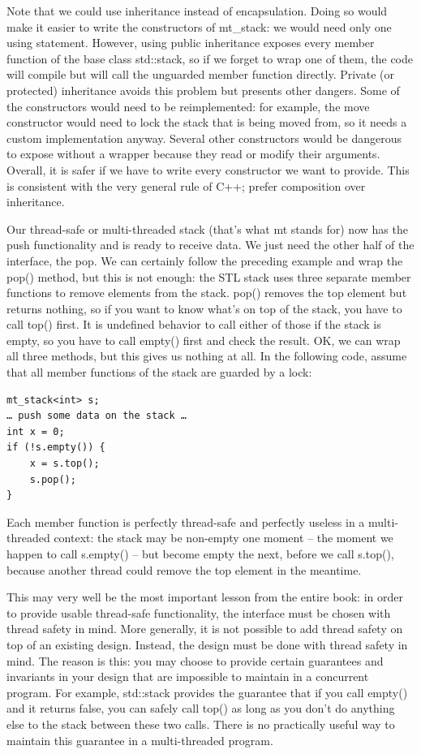 Note that we could use inheritance instead of encapsulation. Doing so would make it easier to write the constructors of mt\_stack: we would need only one using statement. However, using public inheritance exposes every member function of the base class std::stack, so if we forget to wrap one of them, the code will compile but will call the unguarded member function directly. Private (or protected) inheritance avoids this problem but presents other dangers. Some of the constructors would need to be reimplemented: for example, the move constructor would need to lock the stack that is being moved from, so it needs a custom implementation anyway. Several other constructors would be dangerous to expose without a wrapper because they read or modify their arguments. Overall, it is safer if we have to write every constructor we want to provide. This is consistent with the very general rule of C++; prefer composition over inheritance.

Our thread-safe or multi-threaded stack (that's what mt stands for) now has the push functionality and is ready to receive data. We just need the other half of the interface, the pop. We can certainly follow the preceding example and wrap the pop() method, but this is not enough: the STL stack uses three separate member functions to remove elements from the stack. pop() removes the top element but returns nothing, so if you want to know what's on top of the stack, you have to call top() first. It is undefined behavior to call either of those if the stack is empty, so you have to call empty() first and check the result. OK, we can wrap all three methods, but this gives us nothing at all. In the following code, assume that all member functions of the stack are guarded by a lock:

\begin{lstlisting}[style=styleCXX]
mt_stack<int> s;
… push some data on the stack …
int x = 0;
if (!s.empty()) {
	x = s.top();
	s.pop();
}
\end{lstlisting}

Each member function is perfectly thread-safe and perfectly useless in a multi-threaded context: the stack may be non-empty one moment – the moment we happen to call s.empty() – but become empty the next, before we call s.top(), because another thread could remove the top element in the meantime.

This may very well be the most important lesson from the entire book: in order to provide usable thread-safe functionality, the interface must be chosen with thread safety in mind. More generally, it is not possible to add thread safety on top of an existing design. Instead, the design must be done with thread safety in mind. The reason is this: you may choose to provide certain guarantees and invariants in your design that are impossible to maintain in a concurrent program. For example, std::stack provides the guarantee that if you call empty() and it returns false, you can safely call top() as long as you don't do anything else to the stack between these two calls. There is no practically useful way to maintain this guarantee in a multi-threaded program.

